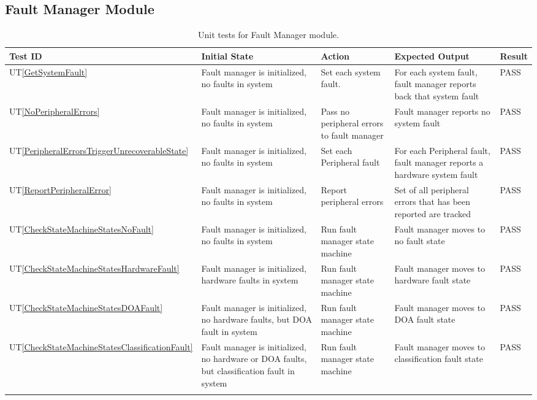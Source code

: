 \documentclass[12pt, titlepage]{article}
\newcommand{\utref}[1]{UT\ref{#1}}
\begin{document}
\subsection{Fault Manager Module}
{\footnotesize
\begin{longtable}{|p{0.8cm}|p{3.5cm}|p{3.5cm}|p{3.5cm}|p{1cm}|}
    \hline
    \textbf{Test ID} & \textbf{Initial State} & \textbf{Action} &
    \textbf{Expected Output} & \textbf{Result} \\ 
    \endfirsthead
    \hline

    \utref{GetSystemFault} & Fault manager is initialized, no faults in system &
    Set each system fault.  & For each system fault, fault manager reports back
    that system fault & PASS\\
    \hline
    \utref{NoPeripheralErrors} & Fault manager is initialized, no faults in
    system & Pass no peripheral errors to fault manager  & Fault manager reports
    no system fault & PASS\\
    \hline
    \utref{PeripheralErrorsTriggerUnrecoverableState} & Fault manager is
    initialized, no faults in system & Set each Peripheral fault & For each
    Peripheral fault, fault manager reports a hardware system fault & PASS\\
    \hline
    \utref{ReportPeripheralError} & Fault manager is initialized, no faults in
    system & Report peripheral errors & Set of all peripheral errors that has
    been reported are tracked & PASS\\
    \hline
    \utref{CheckStateMachineStatesNoFault} & Fault manager is initialized, no
    faults in system & Run fault manager state machine & Fault manager moves to
    no fault state & PASS\\
    \hline
    \utref{CheckStateMachineStatesHardwareFault} & Fault manager is initialized,
    hardware faults in system & Run fault manager state machine & Fault manager
    moves to hardware fault state & PASS\\
    \hline
    \utref{CheckStateMachineStatesDOAFault} & Fault manager is initialized, no
    hardware faults, but DOA fault in system & Run fault manager state machine &
    Fault manager moves to DOA fault state & PASS\\
    \hline
    \utref{CheckStateMachineStatesClassificationFault} & Fault manager is
    initialized, no hardware or DOA faults, but classification fault in system &
    Run fault manager state machine & Fault manager moves to classification
    fault state & PASS\\
    \hline
    \caption{Unit tests for Fault Manager module.}
    \label{tab:unit_test_fault_manager}
\end{longtable}
}
\end{document}
